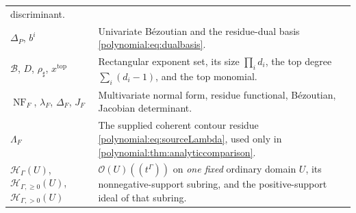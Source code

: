 \documentclass[11pt,letterpaper]{article}
\numberwithin{equation}{section}
\theoremstyle{definition}
\theoremstyle{remark}\newtheorem{remark}[theorem]{Remark}
\newcommand{\OO}{\mathcal O}
\newcommand{\HH}{\mathscr H_\Gamma}
\newcommand{\HHp}{\mathscr H_{\Gamma,>0}}
\newcommand{\HHn}{\mathscr H_{\Gamma,\ge0}}
\newcommand{\NF}{\operatorname{NF}}
\begin{document}
\begin{longtable}{@{}P{0.29\textwidth}P{0.63\textwidth}@{}}
discriminant.\\[0.3em]
$\Delta_P$, $b^i$ & Univariate B\'ezoutian and the residue-dual basis
\eqref{polynomial:eq:dualbasis}.\\[0.3em]
$\mathcal B$, $D$, $\rho_\sharp$, $x^{\mathrm{top}}$ & Rectangular exponent
set, its size $\prod_id_i$, the top degree $\sum_i(d_i-1)$, and the top
monomial.\\[0.3em]
$\NF_F$, $\lambda_F$, $\Delta_F$, $J_F$ & Multivariate normal form, residue
functional, B\'ezoutian, Jacobian determinant.\\[0.3em]
$\Lambda_F$ & The supplied coherent contour residue
\eqref{polynomial:eq:sourceLambda}, used only in
\cref{polynomial:thm:analyticcomparison}.\\[0.3em]
$\HH(U)$, $\HHn(U)$, $\HHp(U)$ & $\OO(U)((t^\Gamma))$ on \emph{one fixed}
ordinary domain $U$, its nonnegative-support subring, and the positive-support
ideal of that subring.\\
\bottomrule
\end{longtable}
\end{document}
